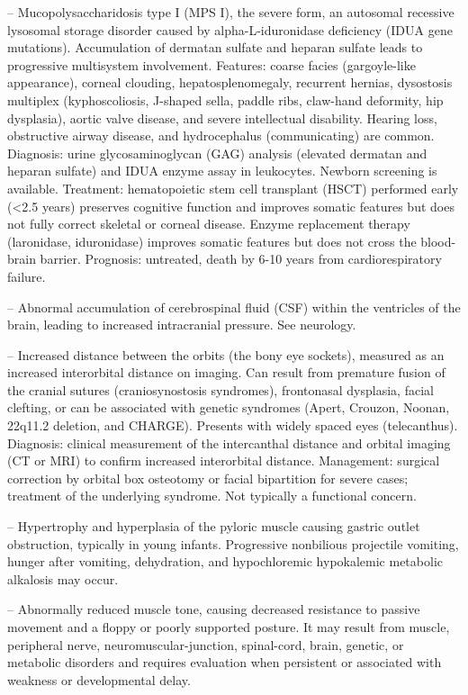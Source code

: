 -- Mucopolysaccharidosis type I (MPS I), the severe form, an autosomal recessive lysosomal storage disorder caused by alpha-L-iduronidase deficiency (IDUA gene mutations). Accumulation of dermatan sulfate and heparan sulfate leads to progressive multisystem involvement. Features: coarse facies (gargoyle-like appearance), corneal clouding, hepatosplenomegaly, recurrent hernias, dysostosis multiplex (kyphoscoliosis, J-shaped sella, paddle ribs, claw-hand deformity, hip dysplasia), aortic valve disease, and severe intellectual disability. Hearing loss, obstructive airway disease, and hydrocephalus (communicating) are common. Diagnosis: urine glycosaminoglycan (GAG) analysis (elevated dermatan and heparan sulfate) and IDUA enzyme assay in leukocytes. Newborn screening is available. Treatment: hematopoietic stem cell transplant (HSCT) performed early (<2.5 years) preserves cognitive function and improves somatic features but does not fully correct skeletal or corneal disease. Enzyme replacement therapy (laronidase, iduronidase) improves somatic features but does not cross the blood-brain barrier. Prognosis: untreated, death by 6-10 years from cardiorespiratory failure.

-- Abnormal accumulation of cerebrospinal fluid (CSF) within the ventricles of the brain, leading to increased intracranial pressure. See neurology.

-- Increased distance between the orbits (the bony eye sockets), measured as an increased interorbital distance on imaging. Can result from premature fusion of the cranial sutures (craniosynostosis syndromes), frontonasal dysplasia, facial clefting, or can be associated with genetic syndromes (Apert, Crouzon, Noonan, 22q11.2 deletion, and CHARGE). Presents with widely spaced eyes (telecanthus). Diagnosis: clinical measurement of the intercanthal distance and orbital imaging (CT or MRI) to confirm increased interorbital distance. Management: surgical correction by orbital box osteotomy or facial bipartition for severe cases; treatment of the underlying syndrome. Not typically a functional concern.

-- Hypertrophy and hyperplasia of the pyloric muscle causing gastric outlet obstruction, typically in young infants. Progressive nonbilious projectile vomiting, hunger after vomiting, dehydration, and hypochloremic hypokalemic metabolic alkalosis may occur.

-- Abnormally reduced muscle tone, causing decreased resistance to passive movement and a floppy or poorly supported posture. It may result from muscle, peripheral nerve, neuromuscular-junction, spinal-cord, brain, genetic, or metabolic disorders and requires evaluation when persistent or associated with weakness or developmental delay.

